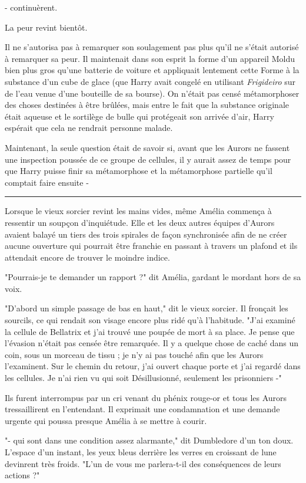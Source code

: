 - continuèrent.

La peur revint bientôt.

Il ne s'autorisa pas à remarquer son soulagement pas plus qu'il ne s'était autorisé à remarquer sa peur. Il maintenait dans son esprit la forme d'un appareil Moldu bien plus gros qu'une batterie de voiture et appliquait lentement cette Forme à la substance d'un cube de glace (que Harry avait congelé en utilisant \emph{Frigideiro}  sur de l'eau venue d'une bouteille de sa bourse). On n'était pas censé métamorphoser des choses destinées à être brûlées, mais entre le fait que la substance originale était aqueuse et le sortilège de bulle qui protégeait son arrivée d'air, Harry espérait que cela ne rendrait personne malade.

Maintenant, la seule question était de savoir si, avant que les Aurors ne fassent une inspection poussée de ce groupe de cellules, il y aurait assez de temps pour que Harry puisse finir sa métamorphose et la métamorphose partielle qu'il comptait faire ensuite -
\par\noindent\rule{\textwidth}{0.4pt}
Lorsque le vieux sorcier revint les mains vides, même Amélia commença à ressentir un soupçon d'inquiétude. Elle et les deux autres équipes d'Aurors avaient balayé un tiers des trois spirales de façon synchronisée afin de ne créer aucune ouverture qui pourrait être franchie en passant à travers un plafond et ils attendait encore de trouver le moindre indice.

"Pourrais-je te demander un rapport ?" dit Amélia, gardant le mordant hors de sa voix.

"D'abord un simple passage de bas en haut," dit le vieux sorcier. Il fronçait les sourcils, ce qui rendait son visage encore plus ridé qu'à l'habitude. "J'ai examiné la cellule de Bellatrix et j'ai trouvé une poupée de mort à sa place. Je pense que l'évasion n'était pas censée être remarquée. Il y a quelque chose de caché dans un coin, sous un morceau de tissu ; je n'y ai pas touché afin que les Aurors l'examinent. Sur le chemin du retour, j'ai ouvert chaque porte et j'ai regardé dans les cellules. Je n'ai rien vu qui soit Désillusionné, seulement les prisonniers -"

Ils furent interrompus par un cri venant du phénix rouge-or et tous les Aurors tressaillirent en l'entendant. Il exprimait une condamnation et une demande urgente qui poussa presque Amélia à se mettre à courir.

"- qui sont dans une condition assez alarmante," dit Dumbledore d'un ton doux. L'espace d'un instant, les yeux bleus derrière les verres en croissant de lune devinrent très froids. "L'un de vous me parlera-t-il des conséquences de leurs actions ?"


